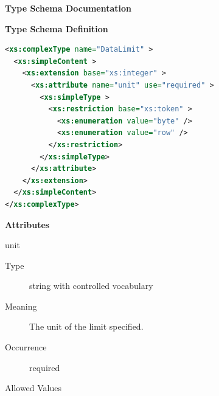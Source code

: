 \documentclass{ivoa}
\begin{document}

\begin{generated}
\begingroup
      	\renewcommand*\descriptionlabel[1]{%
      	\hbox to 5.5em{\emph{#1}\hfil}}\vspace{2ex}\noindent\textbf{ Type Schema Documentation}


\vspace{1ex}\noindent\textbf{ Type Schema Definition}

\begin{lstlisting}[language=XML,basicstyle=\footnotesize]
<xs:complexType name="DataLimit" >
  <xs:simpleContent >
    <xs:extension base="xs:integer" >
      <xs:attribute name="unit" use="required" >
        <xs:simpleType >
          <xs:restriction base="xs:token" >
            <xs:enumeration value="byte" />
            <xs:enumeration value="row" />
          </xs:restriction>
        </xs:simpleType>
      </xs:attribute>
    </xs:extension>
  </xs:simpleContent>
</xs:complexType>
\end{lstlisting}

\vspace{0.5ex}\noindent\textbf{ Attributes}

\begingroup\small\begin{bigdescription}
\item[unit]
\begin{description}
\item[Type] string with controlled vocabulary
\item[Meaning] 
            The unit of the limit specified.
            
\item[Occurrence] required

\item[Allowed Values]\hfil
\begin{longtermsdescription}\item[byte]
\item[row]
\end{longtermsdescription}
\end{description}


\end{bigdescription}\endgroup

\endgroup
\end{generated}
\end{document}
